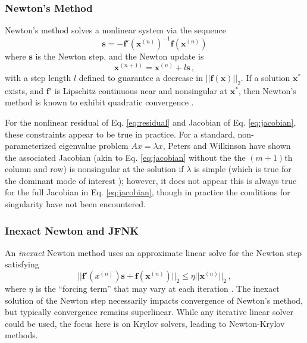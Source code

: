 \subsubsection{Newton's Method}

Newton's method \cite{kelley1995iml} solves a nonlinear system 
via the sequence
\begin{equation}
 \mathbf{s} = -\mathbf{f}'(\mathbf{x}^{(n)})^{-1} \mathbf{f}(\mathbf{x}^{(n)})
 \label{eq:newtonstep}
\end{equation}
where $\mathbf{s}$ is the Newton step, and the Newton update is
\begin{equation}
 \mathbf{x}^{(n+1)} = \mathbf{x}^{(n)} + l \mathbf{s} \, ,
 \label{eq:newtonupdate}
\end{equation}
with a step length $l$ defined to guarantee a decrease in 
$||\mathbf{f(x)}||_2$.  If a solution $\mathbf{x}^*$ exists, 
and $\mathbf{f}'$ is Lipschitz continuous near and nonsingular 
at $\mathbf{x}^*$, then Newton's method is known to exhibit 
quadratic convergence \cite{kelley1995iml}.  

For the nonlinear residual of Eq. \ref{eq:residual} and 
Jacobian of Eq. \ref{eq:jacobian}, these constraints appear to 
be true in practice.  For a standard, non-parameterized eigenvalue 
problem $Ax = \lambda x$, Peters and Wilkinson \cite{peters1979iii} 
have shown the associated Jacobian (akin to Eq. \ref{eq:jacobian} 
without the the $(m+1)$th column and row) is nonsingular at the 
solution if $\lambda$ is simple (which is true for the dominant 
mode of interest \cite{lindahl1981rrm}); however, it does not 
appear this is always true for the full Jacobian in 
Eq. \ref{eq:jacobian}, though in practice the conditions for 
singularity have not been encountered.

\subsubsection{Inexact Newton and JFNK}

An {\it inexact} Newton method uses an approximate linear solve for 
the Newton step satisfying 
\begin{equation}
 || \mathbf{f}'({x}^{(n)}) \mathbf{s} + \mathbf{f}(\mathbf{x}^{(n)}) ||_2  
   \le \eta || \mathbf{x}^{(n)} ||_2 \, ,
 \label{eq:inexactnewtonstep}
\end{equation}
where $\eta$ is the ``forcing term'' that may vary at each 
iteration \cite{kelley1995iml}. 
The inexact solution of the Newton step necessarily 
impacts convergence of Newton's method, but typically convergence 
remains superlinear.  While any iterative linear solver could 
be used, the focus here is on Krylov solvers,
leading to Newton-Krylov methods.

